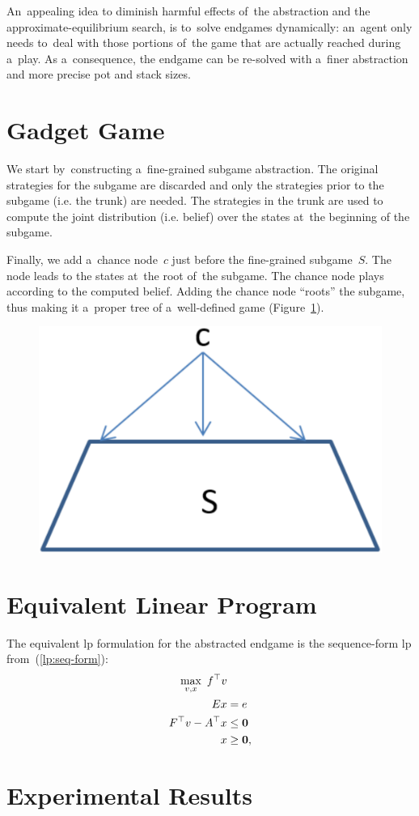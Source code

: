 An~appealing idea to diminish harmful effects of~the abstraction and the approximate-equilibrium search, is to~solve endgames dynamically:
an~agent only needs to~deal with those portions of~the game that are actually reached during a~play.
As a~consequence, the endgame can be re-solved with a~finer abstraction and more precise pot and stack sizes.

\section{Gadget Game}
We start by~constructing a~fine-grained subgame abstraction.
The original strategies for the subgame are discarded and only the strategies prior to the subgame (i.e. the trunk) are needed.
The strategies in the trunk are used to compute the joint distribution (i.e. belief) over the states at~the beginning of the subgame.

Finally, we add a~chance node~$c$ just before the fine-grained subgame~$S$.
The node leads to the states at~the root of~the subgame.
The chance node plays according to the computed belief.
Adding the chance node ``roots'' the subgame, thus making it a~proper tree of a~well-defined game (Figure~\ref{fig:endgame-solving-gadget}).
\begin{figure}[H]
  \centering
  \includegraphics[width=.3\textwidth]{../img/endgame-solving-gadget.png}
  \label{fig:endgame-solving-gadget}
\end{figure}

\section{Equivalent Linear Program}
\todo

The equivalent \acrshort{lp} formulation for the abstracted endgame is the sequence-form \acrshort{lp} from~(\ref{lp:seq-form}):
\begin{equation*}
  \begin{split}
    \max_{v, x}\  f^\top v & \\
    Ex &= e \\
    F^\top v - A^\top x &\le \boldsymbol{0} \\
    x &\ge \boldsymbol{0},
  \end{split}
\end{equation*}

\section{Experimental Results}
